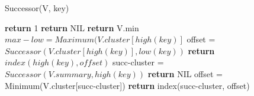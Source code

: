 \documentclass{article}
\begin{document}
            \begin{algorithm}
                \caption{Successor(V, key)}
                \begin{algorithmic}
                    
                            \STATE \textbf{return} 1
                        \ELSE 
                            \STATE \textbf{return} NIL
                        \ENDIF
                        \STATE \textbf{return} V.min
                    \ELSE
                        \STATE $max-low = Maximum(V.cluster[high(key)]$
                            \STATE offset = $Successor(V.cluster[high(key)], low(key))$
                            \STATE \textbf{return} $index(high(key), offset)$
                        \ELSE
                            \STATE succ-cluster = $Successor( V.summary, high(key) )$
                                \STATE \textbf{return} NIL
                            \ELSE 
                                \STATE offset = Minimum(V.cluster[succ-cluster])
                                \STATE \textbf{return} index(succ-cluster, offset)
                            \ENDIF
                        \ENDIF
                        
                    \ENDIF %
                \end{algorithmic}
            \end{algorithm}
            
\end{document}
